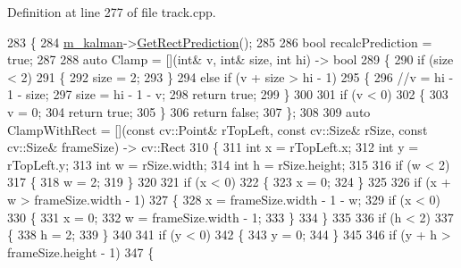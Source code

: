 Definition at line 277 of file track.\+cpp.


\begin{DoxyCode}
283 \{
284     \mbox{\hyperlink{class_c_track_a8d676e67fb1b5cae95cc7db3cdc24f5f}{m\_kalman}}->\mbox{\hyperlink{class_t_kalman_filter_af112feed15a064055987a1faedf9673d}{GetRectPrediction}}();
285 
286     \textcolor{keywordtype}{bool} recalcPrediction = \textcolor{keyword}{true};
287 
288     \textcolor{keyword}{auto} Clamp = [](\textcolor{keywordtype}{int}& v, \textcolor{keywordtype}{int}& size, \textcolor{keywordtype}{int} hi) -> \textcolor{keywordtype}{bool}
289     \{
290         \textcolor{keywordflow}{if} (size < 2)
291         \{
292             size = 2;
293         \}
294         \textcolor{keywordflow}{else} \textcolor{keywordflow}{if} (v + size > hi - 1)
295         \{
296             \textcolor{comment}{//v = hi - 1 - size;}
297             size = hi - 1 - v;
298             \textcolor{keywordflow}{return} \textcolor{keyword}{true};
299         \}
300 
301         \textcolor{keywordflow}{if} (v < 0)
302         \{
303             v = 0;
304             \textcolor{keywordflow}{return} \textcolor{keyword}{true};
305         \}
306         \textcolor{keywordflow}{return} \textcolor{keyword}{false};
307     \};
308 
309     \textcolor{keyword}{auto} ClampWithRect = [](\textcolor{keyword}{const} cv::Point& rTopLeft, \textcolor{keyword}{const} cv::Size& rSize, \textcolor{keyword}{const} cv::Size& frameSize) ->
       cv::Rect
310     \{
311         \textcolor{keywordtype}{int} x = rTopLeft.x;
312         \textcolor{keywordtype}{int} y = rTopLeft.y;
313         \textcolor{keywordtype}{int} w = rSize.width;
314         \textcolor{keywordtype}{int} h = rSize.height;
315         
316         \textcolor{keywordflow}{if} (w < 2)
317         \{
318             w = 2;
319         \}
320         
321         \textcolor{keywordflow}{if} (x < 0)
322         \{
323             x = 0;
324         \}       
325         
326         \textcolor{keywordflow}{if} (x + w > frameSize.width - 1)
327         \{
328             x = frameSize.width - 1 - w;
329             \textcolor{keywordflow}{if} (x < 0)
330             \{
331                 x = 0;
332                 w = frameSize.width - 1;
333             \}
334         \}
335 
336         \textcolor{keywordflow}{if} (h < 2)
337         \{
338             h = 2;
339         \}
340         
341         \textcolor{keywordflow}{if} (y < 0)
342         \{
343             y = 0;
344         \}
345         
346         \textcolor{keywordflow}{if} (y + h > frameSize.height - 1)
347         \{

\end{DoxyCode}
